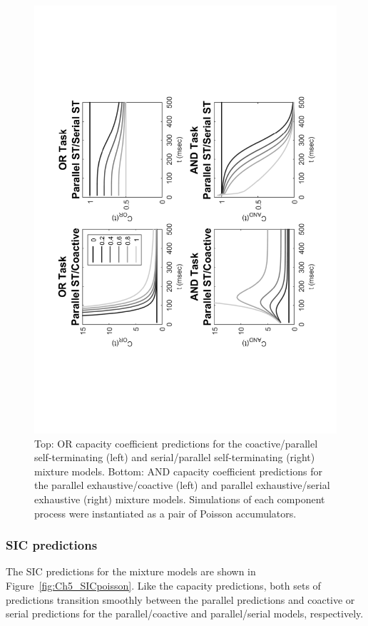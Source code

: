 \begin{figure}[htb]
\centering
\includegraphics[scale=.7, angle=-90]{Figures/Mix/Figure_2.pdf}
\caption{Top: OR capacity coefficient predictions for the coactive/parallel self-terminating (left) and serial/parallel self-terminating (right) mixture models. Bottom: AND capacity coefficient predictions for the parallel exhaustive/coactive (left) and parallel exhaustive/serial exhaustive (right) mixture models. Simulations of each component process were instantiated as a pair of Poisson accumulators.}
\label{fig:Ch5_CapPoisson}
\end{figure}


\subsubsection{SIC predictions} 
The SIC predictions for the mixture models are shown in Figure~\ref{fig:Ch5_SICpoisson}. Like the capacity predictions, both sets of predictions transition smoothly between the parallel predictions and coactive or serial predictions for the parallel/coactive and parallel/serial models, respectively. 

